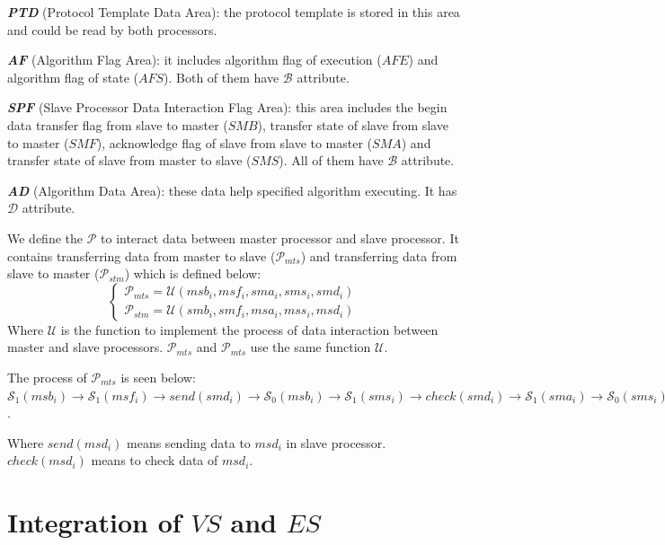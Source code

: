 \documentclass[journal,UTF8]{IEEEtran}
\begin{document}
\textbf{\emph{PTD}} (Protocol Template Data Area): the protocol template is stored in this area and could be read by both processors.


\textbf{\emph{AF}} (Algorithm Flag Area): it includes algorithm flag of execution ($AFE$) and algorithm flag of state ($AFS$).
Both of them have $\mathcal{B}$ attribute.

\textbf{\emph{SPF}} (Slave Processor Data Interaction Flag Area): this area includes the begin data transfer flag from slave to master ($SMB$), transfer state of slave from slave to master ($SMF$), acknowledge flag of slave from slave to master ($SMA$) and transfer state of slave from master to slave ($SMS$). All of them have $\mathcal{B}$ attribute.

\textbf{\emph{AD}} (Algorithm Data Area): these data help specified algorithm executing. It has $\mathcal{D}$ attribute.
 
 We define the $\mathcal{P}$ to interact data between master processor and slave processor. It contains transferring data from master to slave ($\mathcal{P}_{mts}$) and transferring data from slave to master ($\mathcal{P}_{stm}$) which is defined below:
 \begin{equation}
 \left\{
 \begin{array}{l}
 \mathcal{P}_{mts} = \mathcal{U} (msb_i,msf_i,sma_i,sms_i,smd_i)\\
 \mathcal{P}_{stm} = \mathcal{U} (smb_i,smf_i,msa_i,mss_i,msd_i)
 \end{array}
 \right.
 \end{equation}
 Where $\mathcal{U}$ is the function to implement the process of data interaction between master and slave processors. $\mathcal{P}_{mts}$ and $\mathcal{P}_{mts}$ use the same function $\mathcal{U}$.
 
 The process of $\mathcal{P}_{mts}$ is seen below:
 	$\mathcal{S}_1(msb_i)\to\mathcal{S}_1(msf_i)\to send(smd_i)\to\mathcal{S}_0(msb_i)\to\mathcal{S}_1(sms_i)\to check(smd_i)\to\mathcal{S}_1(sma_i)\to\mathcal{S}_0(sms_i)\to\mathcal{S}_0(sma_i)\to\mathcal{S}_0(msf_i)$.
 
 Where $send(msd_i)$ means sending data to $msd_i$ in slave processor. $check(msd_i)$ means to check data of $msd_i$.

 

\section{Integration of $VS$ and $ES$}
\label{Integration}
\end{document}

